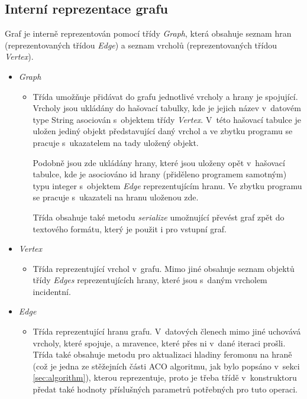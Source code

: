 \documentclass[a4paper, 12pt]{article}
\begin{document}
\subsection{Interní reprezentace grafu}
\label{subsec:graph}
Graf je interně reprezentován pomocí třídy \emph{Graph}, která obsahuje seznam hran (reprezentovaných třídou \emph{Edge}) a seznam vrcholů (reprezentovaných
třídou \emph{Vertex}).
\begin{itemize}
  \item \emph{Graph}
  \begin{itemize}
    \item[] Třída umožňuje přidávat do grafu jednotlivé vrcholy a hrany je spojující. Vrcholy jsou ukládány do hašovací tabulky, kde je jejich název v~datovém
    type String asociován s~objektem třídy \emph{Vertex}. V~této hašovací tabulce je uložen jediný objekt představující daný vrchol a
    ve zbytku programu se pracuje s~ukazatelem na tady uložený objekt.
    
    Podobně jsou zde ukládány hrany, které jsou uloženy opět v~hašovací tabulce, kde je asociováno id hrany (přiděleno programem samotným) typu integer
    s~objektem \emph{Edge} reprezentujícím hranu. Ve zbytku programu se pracuje s~ukazateli na hranu uloženou zde.

    Třída obsahuje také metodu \emph{serialize} umožnující převést graf zpět do textového formátu, který je použit i pro vstupní graf.
  \end{itemize}

  \item \emph{Vertex}
  \begin{itemize}
    \item[] Třída reprezentující vrchol v~grafu. Mimo jiné obsahuje seznam objektů třídy \emph{Edges} reprezentujících hrany, které jsou s~daným vrcholem
    incidentní.
  \end{itemize}

  \item \emph{Edge}
  \begin{itemize}
    \item[] Třída reprezentující hranu grafu. V~datových členech mimo jiné uchovává vrcholy, které spojuje, a mravence, které přes ni v~dané iteraci prošli. 
    Třída také obsahuje metodu pro aktualizaci hladiny feromonu na hraně (což je jedna ze stěžejních části ACO algoritmu, jak bylo popsáno v~sekci 
    \ref{sec:algorithm}), kterou reprezentuje, proto je třeba třídě v~konstruktoru předat také hodnoty příslušných parametrů potřebných pro tuto operaci.
  \end{itemize}
\end{itemize}
\end{document}
